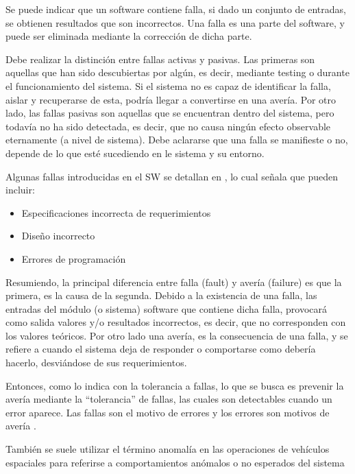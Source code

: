 Se puede indicar que un software contiene falla, si dado un conjunto de entradas, se obtienen
resultados que son incorrectos. Una falla es una parte del software, y puede ser eliminada mediante 
la corrección de dicha parte. \citep{XIE}

Debe realizar la distinción entre fallas activas y pasivas. Las primeras son aquellas que han sido descubiertas por algún, es decir, mediante testing o durante el funcionamiento del sistema. Si el sistema no es capaz de identificar la falla, aislar y recuperarse de esta, podría llegar a convertirse en una avería. Por otro lado, las fallas pasivas son aquellas que se encuentran dentro del sistema, pero todavía no ha sido detectada, es decir, que no causa ningún efecto observable eternamente (a nivel de sistema). Debe aclararse que una falla se manifieste o no, depende de lo que esté sucediendo en le sistema y su entorno. 

Algunas fallas introducidas en el \ac{SW} se detallan en \cite{Hanmer07}, lo cual señala que
pueden incluir:
\begin{itemize}
 \item Especificaciones incorrecta de requerimientos
 \item Diseño incorrecto
 \item Errores de programación
\end{itemize}


Resumiendo, la principal diferencia entre falla (fault) y avería (failure) es que la primera, es 
la causa de la segunda. Debido a la existencia de una falla, las entradas del módulo (o sistema) software
que contiene dicha falla, provocará como salida valores y/o resultados incorrectos, es decir, 
que no corresponden con los valores teóricos. Por otro lado una avería, es la consecuencia de una falla, 
y se refiere a cuando el sistema deja de responder o comportarse como debería hacerlo, desviándose 
de sus requerimientos. 

Entonces, como lo indica \cite{Pullum01} con la tolerancia a fallas, lo que se busca es prevenir la
avería mediante la ``tolerancia'' de fallas, las cuales son detectables cuando un error aparece.
Las fallas son el motivo de errores y los errores son motivos de avería \citep{FTDesign}.

También se suele utilizar el término anomalía en las operaciones de vehículos espaciales para
referirse a comportamientos anómalos o no esperados del sistema \citep{SpaceSystemFailures}

